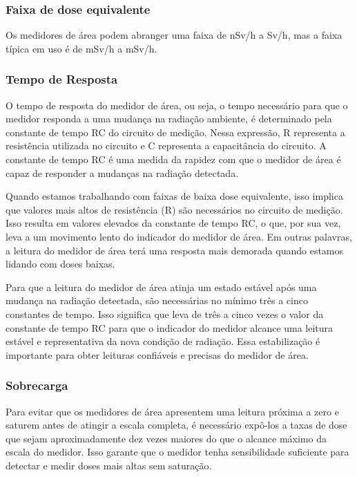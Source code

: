 \documentclass[11pt,a4paper]{article}
\begin{document}
\subsubsection*{Faixa de dose equivalente}

	Os medidores de área podem abranger uma faixa de nSv/h a Sv/h, mas a faixa típica em uso é de mSv/h a mSv/h.

\subsubsection*{Tempo de Resposta}

	O tempo de resposta do medidor de área, ou seja, o tempo necessário para que o medidor responda a uma mudança na radiação ambiente, é determinado pela constante de tempo RC do circuito de medição. Nessa expressão, R representa a resistência utilizada no circuito e C representa a capacitância do circuito. A constante de tempo RC é uma medida da rapidez com que o medidor de área é capaz de responder a mudanças na radiação detectada.

	Quando estamos trabalhando com faixas de baixa dose equivalente, isso implica que valores mais altos de resistência (R) são necessários no circuito de medição. Isso resulta em valores elevados da constante de tempo RC, o que, por sua vez, leva a um movimento lento do indicador do medidor de área. Em outras palavras, a leitura do medidor de área terá uma resposta mais demorada quando estamos lidando com doses baixas.

	Para que a leitura do medidor de área atinja um estado estável após uma mudança na radiação detectada, são necessárias no mínimo três a cinco constantes de tempo. Isso significa que leva de três a cinco vezes o valor da constante de tempo RC para que o indicador do medidor alcance uma leitura estável e representativa da nova condição de radiação. Essa estabilização é importante para obter leituras confiáveis e precisas do medidor de área.

\subsubsection*{Sobrecarga}

	Para evitar que os medidores de área apresentem uma leitura próxima a zero e saturem antes de atingir a escala completa, é necessário expô-los a taxas de dose que sejam aproximadamente dez vezes maiores do que o alcance máximo da escala do medidor. Isso garante que o medidor tenha sensibilidade suficiente para detectar e medir doses mais altas sem saturação.
\end{document}

